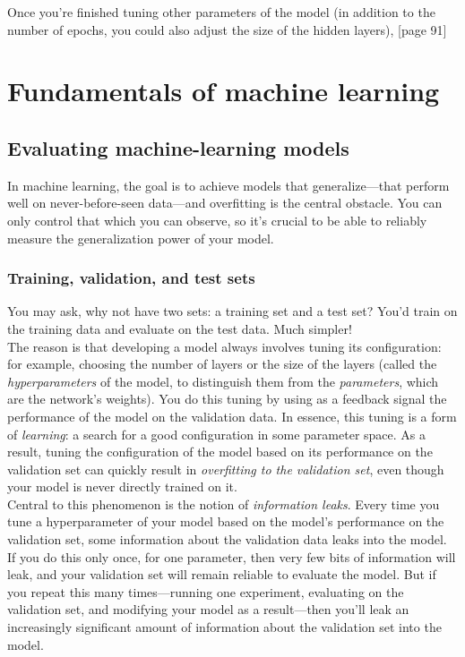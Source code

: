 \documentclass{article}
\numberwithin{equation}{section} %
\begin{document}
Once you’re finished tuning other parameters of the model (in addition to the
number of epochs, you could also adjust the size of the hidden layers), [page 91] \\


\newpage

\section{Fundamentals of machine learning}

\subsection{Evaluating machine-learning models}

In machine learning, the goal is to achieve models that generalize—that perform
well on never-before-seen data—and overfitting is the central obstacle. You can only
control that which you can observe, so it’s crucial to be able to reliably measure the generalization power of your model.

\subsubsection{Training, validation, and test sets}

You may ask, why not have two sets: a training set and a test set? You’d train on the training data and evaluate on the test data. Much simpler! \\

The reason is that developing a model always involves tuning its configuration: for
example, choosing the number of layers or the size of the layers (called the \textit{hyperparameters} of the model, to distinguish them from the \textit{parameters}, which are the network’s weights). You do this tuning by using as a feedback signal the performance of the model on the validation data. In essence, this tuning is a form of \textit{learning}: a search for a good configuration in some parameter space. As a result, tuning the configuration of the model based on its performance on the validation set can quickly result in \textit{overfitting to the validation set}, even though your model is never directly trained on it. \\

Central to this phenomenon is the notion of \textit{information leaks}. Every time you tune a hyperparameter of your model based on the model’s performance on the validation set, some information about the validation data leaks into the model. If you do this only once, for one parameter, then very few bits of information will leak, and your validation set will remain reliable to evaluate the model. But if you repeat this many times—running one experiment, evaluating on the validation set, and modifying your model as a result—then you’ll leak an increasingly significant amount of information about the validation set into the model. \\
\end{document}

